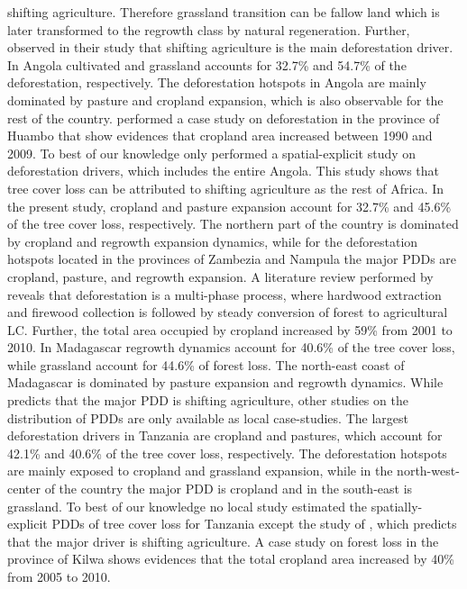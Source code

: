shifting agriculture. Therefore grassland transition can be fallow land which is later transformed to the regrowth class by natural regeneration. Further, \citet{Curtis2018} observed in their study that shifting agriculture is the main deforestation driver. In Angola cultivated and grassland accounts for 32.7\% and 54.7\% of the deforestation, respectively. The deforestation hotspots in Angola are mainly dominated by pasture and cropland expansion, which is also observable for the rest of the country. \citet{Cabral2011} performed a case study on deforestation in the province of Huambo that show evidences that cropland area increased between 1990 and 2009. To best of our knowledge only \citet{Curtis2018} performed a spatial-explicit study on deforestation drivers, which includes the entire Angola. This study shows that tree cover loss can be attributed to shifting agriculture as the rest of Africa. In the present study, cropland and pasture expansion account for 32.7\% and 45.6\% of the tree cover loss, respectively. The northern part of the country is dominated by cropland and regrowth expansion dynamics, while for the deforestation hotspots located in the provinces of Zambezia and Nampula the major \acp{PDD} are cropland, pasture, and regrowth expansion. A literature review performed by \citet{Sitoe2012} reveals that deforestation is a multi-phase process, where hardwood extraction and firewood collection is followed by steady conversion of forest to agricultural \ac{LC}. Further, the total area occupied by cropland increased by 59\% from 2001 to 2010. In Madagascar regrowth dynamics account for 40.6\% of the tree cover loss, while grassland account for 44.6\% of forest loss. The north-east coast of Madagascar is dominated by pasture expansion and regrowth dynamics. While \citet{Curtis2018} predicts that the major \ac{PDD} is shifting agriculture, other studies on the distribution of \acp{PDD} are only available as local case-studies. The largest deforestation drivers in Tanzania are cropland and pastures, which account for 42.1\% and 40.6\% of the tree cover loss, respectively. The deforestation hotspots are mainly exposed to cropland and grassland expansion, while in the north-west-center of the country the major \ac{PDD} is cropland and in the south-east is grassland. To best of our knowledge no local study estimated the spatially-explicit \acp{PDD} of tree cover loss for Tanzania except the study of \citet{Curtis2018}, which predicts that the major driver is shifting agriculture. A case study on forest loss in the province of Kilwa shows evidences that the total cropland area increased by 40\% from 2005 to 2010.
